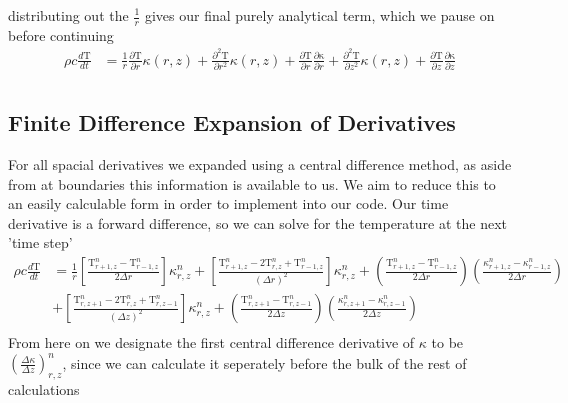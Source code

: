 \documentclass[12pt]{article}
\begin{document}
	  distributing out the $\frac{1}{r}$ gives our final purely analytical term, which we pause on before continuing
		\begin{equation}
		\begin{aligned}
		\rho c \frac{d\mathrm{T}}{dt} &= \frac{1}{r} \frac{\partial\mathrm{T}}{\partial r}\kappa(r, z) + \frac{\partial^2\mathrm{T}}{\partial r^2}\kappa(r, z)  + \frac{\partial\mathrm{T}}{\partial r} \frac{\partial\mathrm{\kappa}}{\partial r}  + \frac{\partial^2\mathrm{T}}{\partial z^2}\kappa(r, z) + \frac{\partial\mathrm{T}}{\partial z}\frac{\partial\mathrm{\kappa}}{\partial z} \\
		\end{aligned}
		\end{equation}
    \subsection{Finite Difference Expansion of Derivatives}
	  For all spacial derivatives we expanded using a central difference method, as aside from at boundaries this information is available to us. We aim to reduce this to an easily calculable form in order to implement into our code. Our time derivative is a forward difference, so we can solve for the temperature at the next 'time step'
		\begin{equation}
		\begin{aligned}
		\rho c \frac{d\mathrm{T}}{dt} &= \frac{1}{r} \left [\frac{\mathrm{T}^{n}_{r + 1, z} - \mathrm{T}^{n}_{r - 1, z}}{2\Delta r}  \right ]\kappa^{n}_{r, z} + \left [\frac{\mathrm{T}^{n}_{r + 1, z}  - 2 \mathrm{T}^{n}_{r, z} +  \mathrm{T}^{n}_{r - 1, z}}{(\Delta r)^2} \right ]  \kappa^{n}_{r, z} + (\frac{\mathrm{T}^{n}_{r + 1, z} - \mathrm{T}^{n}_{r - 1, z}}{2\Delta r}) (\frac{\kappa^{n}_{r + 1, z} - \kappa^{n}_{r - 1, z}}{2\Delta r}) \\
		&+ \left [\frac{\mathrm{T}^{n}_{r, z + 1}  - 2 \mathrm{T}^{n}_{r, z} +  \mathrm{T}^{n}_{r, z -1}}{(\Delta z)^2} \right ]\kappa^n_{r, z} + (\frac{\mathrm{T}^{n}_{r, z + 1} - \mathrm{T}^{n}_{r, z - 1}}{2\Delta z})(\frac{\kappa^{n}_{r, z + 1} - \kappa^{n}_{r,z - 1}}{2\Delta z}) \\
		\end{aligned}
		\end{equation}
		From here on we designate the first central difference derivative of $\kappa$ to be $(\frac{\Delta \kappa}{\Delta z})^n_{r, z}$, since we can calculate it seperately before the bulk of the rest of calculations 
\end{document}
